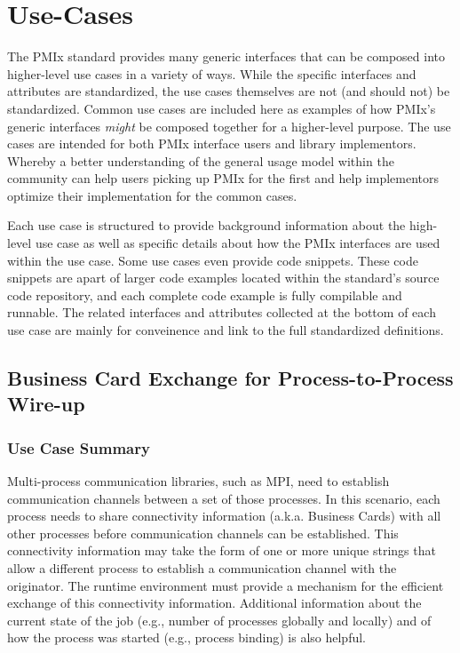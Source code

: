 \chapter{Use-Cases}
\label{app:use-cases}

The \ac{PMIx} standard provides many generic interfaces that can be composed into higher-level use cases in a variety of ways. While the specific interfaces and attributes are standardized, the use cases themselves are not (and should not) be standardized. Common use cases are included here as examples of how PMIx's generic interfaces \textit{might} be composed together for a higher-level purpose. The use cases are intended for both \ac{PMIx} interface users and library implementors. Whereby a better understanding of the general usage model within the community can help users picking up PMIx for the first and help implementors optimize their implementation for the common cases.

Each use case is structured to provide background information about the high-level use case as well as specific details about how the PMIx interfaces are used within the use case. Some use cases even provide code snippets. These code snippets are apart of larger code examples located within the standard's source code repository, and each complete code example is fully compilable and runnable. The related interfaces and attributes collected at the bottom of each use case are mainly for conveinence and link to the full standardized definitions.

\section {Business Card Exchange for Process-to-Process Wire-up}
\label{app:uc-business-card-exchange}

\subsection{Use Case Summary}

Multi-process communication libraries, such as MPI, need to establish communication channels between a set of those processes. In this scenario, each process needs to share connectivity information (a.k.a. Business Cards) with all other processes before communication channels can be established. This connectivity information may take the form of one or more unique strings that allow a different process to establish a communication channel with the originator. The runtime environment must provide a mechanism for the efficient exchange of this connectivity information. Additional information about the current state of the job (e.g., number of processes globally and locally) and of how the process was started (e.g., process binding) is also helpful.


